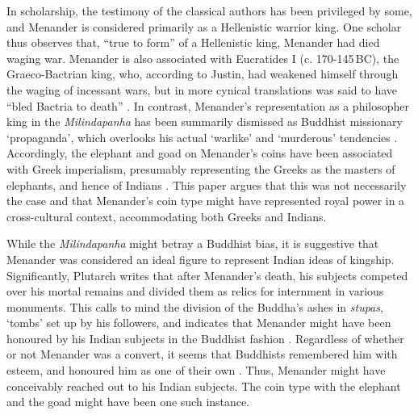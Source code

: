 \documentclass{ijsra}
\renewcommand\BC{{\,BC\xspace}}
\begin{document}
In scholarship, the testimony of the classical authors has been privileged by some, and Menander is considered primarily as a Hellenistic warrior king.
One scholar thus observes that, “true to form” of a Hellenistic king, Menander had died waging war.
Menander is also associated with Eucratides I (c. 170-145\BC),
the Graeco-Bactrian king, who, according to Justin,
had weakened himself through the waging of incessant wars,
but in more cynical translations was said to have “bled Bactria to death”
\parencites[128]{Holt2005}[156]{Mairs2014}[]{Justin. Ep. 41.6}[270]{Tarn1951}.
In contrast, Menander’s representation as a philosopher king in the \emph{Milindapanha} has been summarily dismissed as Buddhist missionary ‘propaganda’, which overlooks his actual ‘warlike’ and ‘murderous’ tendencies \parencites[234]{Widemann2000}[15--16]{Widemann2007}.
Accordingly, the elephant and goad on Menander’s coins have been associated with Greek imperialism, presumably representing the Greeks as the masters of elephants, and hence of Indians \parencite[87--89]{Fussman1993}.
This paper argues that this was not necessarily the case and that Menander’s coin type might have represented royal power in a cross-cultural context, accommodating both Greeks and Indians.

While the \emph{Milindapanha} might betray a Buddhist bias, it is suggestive that Menander was considered an ideal figure to represent Indian ideas of kingship.
Significantly, Plutarch writes that after Menander’s death, his subjects competed over his mortal remains and divided them as relics for internment in various monuments.
This calls to mind the division of the Buddha’s ashes in \emph{stupas}, ‘tombs’ set up by his followers, and indicates that Menander might have been honoured by his Indian subjects in the Buddhist fashion \parencites[]{Plut. Mor. 821d}[145]{Rothkrug2006}.
Regardless of whether or not Menander was a convert, it seems that Buddhists remembered him with esteem, and honoured him as one of their own \parencite[644]{Mairs2015}.
Thus, Menander might have conceivably reached out to his Indian subjects. The coin type with the elephant and the goad might have been one such instance.
\end{document}
